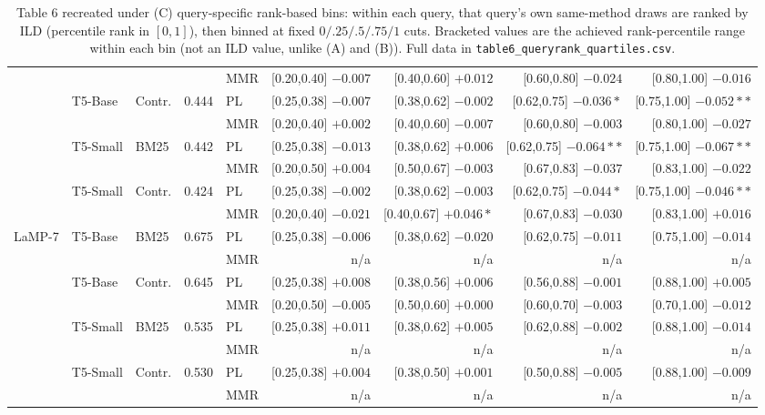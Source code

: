 \documentclass[10pt]{article}
\begin{document}
\begin{table}[p]
\begin{tabular}{@{}lllrlrrrr@{}}
 &  &  &  & MMR & [0.20,0.40] $-0.007$ & [0.40,0.60] $+0.012$ & [0.60,0.80] $-0.024$ & [0.80,1.00] $-0.016$ \\
\cmidrule(lr){1-9}
 & \multirow{2}{*}{T5-Base} & \multirow{2}{*}{Contr.} & \multirow{2}{*}{0.444} & PL & [0.25,0.38] $-0.007$ & [0.38,0.62] $-0.002$ & [0.62,0.75] $-0.036*$ & [0.75,1.00] $-0.052**$ \\
 &  &  &  & MMR & [0.20,0.40] $+0.002$ & [0.40,0.60] $-0.007$ & [0.60,0.80] $-0.003$ & [0.80,1.00] $-0.027$ \\
\cmidrule(lr){1-9}
 & \multirow{2}{*}{T5-Small} & \multirow{2}{*}{BM25} & \multirow{2}{*}{0.442} & PL & [0.25,0.38] $-0.013$ & [0.38,0.62] $+0.006$ & [0.62,0.75] $-0.064**$ & [0.75,1.00] $-0.067**$ \\
 &  &  &  & MMR & [0.20,0.50] $+0.004$ & [0.50,0.67] $-0.003$ & [0.67,0.83] $-0.037$ & [0.83,1.00] $-0.022$ \\
\cmidrule(lr){1-9}
 & \multirow{2}{*}{T5-Small} & \multirow{2}{*}{Contr.} & \multirow{2}{*}{0.424} & PL & [0.25,0.38] $-0.002$ & [0.38,0.62] $-0.003$ & [0.62,0.75] $-0.044*$ & [0.75,1.00] $-0.046**$ \\
 &  &  &  & MMR & [0.20,0.40] $-0.021$ & [0.40,0.67] $+0.046*$ & [0.67,0.83] $-0.030$ & [0.83,1.00] $+0.016$ \\
\midrule
\multirow{2}{*}{LaMP-7} & \multirow{2}{*}{T5-Base} & \multirow{2}{*}{BM25} & \multirow{2}{*}{0.675} & PL & [0.25,0.38] $-0.006$ & [0.38,0.62] $-0.020$ & [0.62,0.75] $-0.011$ & [0.75,1.00] $-0.014$ \\
 &  &  &  & MMR & n/a & n/a & n/a & n/a \\
\cmidrule(lr){1-9}
 & \multirow{2}{*}{T5-Base} & \multirow{2}{*}{Contr.} & \multirow{2}{*}{0.645} & PL & [0.25,0.38] $+0.008$ & [0.38,0.56] $+0.006$ & [0.56,0.88] $-0.001$ & [0.88,1.00] $+0.005$ \\
 &  &  &  & MMR & [0.20,0.50] $-0.005$ & [0.50,0.60] $+0.000$ & [0.60,0.70] $-0.003$ & [0.70,1.00] $-0.012$ \\
\cmidrule(lr){1-9}
 & \multirow{2}{*}{T5-Small} & \multirow{2}{*}{BM25} & \multirow{2}{*}{0.535} & PL & [0.25,0.38] $+0.011$ & [0.38,0.62] $+0.005$ & [0.62,0.88] $-0.002$ & [0.88,1.00] $-0.014$ \\
 &  &  &  & MMR & n/a & n/a & n/a & n/a \\
\cmidrule(lr){1-9}
 & \multirow{2}{*}{T5-Small} & \multirow{2}{*}{Contr.} & \multirow{2}{*}{0.530} & PL & [0.25,0.38] $+0.004$ & [0.38,0.50] $+0.001$ & [0.50,0.88] $-0.005$ & [0.88,1.00] $-0.009$ \\
 &  &  &  & MMR & n/a & n/a & n/a & n/a \\
\bottomrule
\end{tabular}
\caption{Table 6 recreated under (C) query-specific rank-based bins: within each
query, that query's own same-method draws are ranked by ILD (percentile rank in
$[0,1]$), then binned at fixed $0/.25/.5/.75/1$ cuts. Bracketed values are the
achieved rank-percentile range within each bin (not an ILD value, unlike (A) and
(B)). Full data in \texttt{table6\_queryrank\_quartiles.csv}.}
\label{tab:table6-C}
\end{table}
\end{document}

